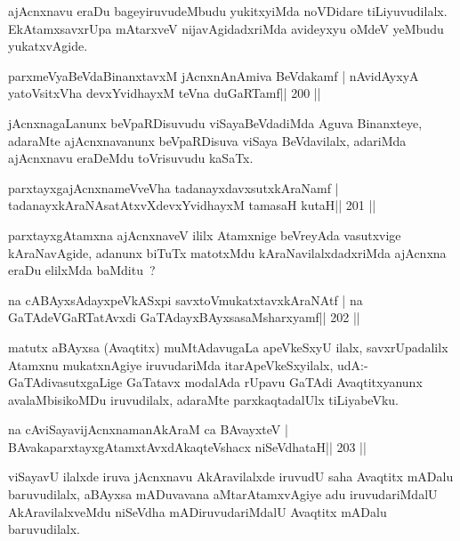 \begin{artha}
ajAcnxnavu eraDu bageyiruvudeMbudu yukitxyiMda noVDidare tiLiyuvudilalx. EkAtamxsavxrUpa mAtarxveV nijavAgidadxriMda avideyxyu oMdeV yeMbudu yukatxvAgide.
\end{artha}

\begin{shl}
parxmeVyaBeVdaBinanxtavxM jAcnxnAnAmiva BeVdakamf |
nAvidAyxyA yatoV\s sitxVha devxYvidhayxM teVna duGaRTamf\hfill || 200 ||
\end{shl}

\begin{artha}
jAcnxnagaLanunx beVpaRDisuvudu viSayaBeVdadiMda Aguva Binanxteye, adaraMte ajAcnxnavanunx beVpaRDisuva viSaya BeVdavilalx, adariMda ajAcnxnavu eraDeMdu toVrisuvudu kaSaTx.
\end{artha}


\begin{shl}
parxtayxgajAcnxnameVveVha tadanayxdavxsutxkAraNamf |
tadanayxkAraNAsatAtxvXdevxYvidhayxM tamasaH kutaH\hfill || 201 ||
\end{shl}

\begin{artha}
parxtayxgAtamxna ajAcnxnaveV ililx Atamxnige beVreyAda vasutxvige kAraNavAgide, adanunx biTuTx matotxMdu kAraNavilalxdadxriMda ajAcnxna eraDu elilxMda baMditu~?
\end{artha}

\begin{shl}
na cABAyxsAdayxpeVkASx\s pi savxtoVmukatxtavxkAraNAtf |
na GaTAdeVGaRTatAvxdi GaTAdayxBAyxsasaMsharxyamf\hfill || 202 ||
\end{shl}

\begin{artha}
matutx aBAyxsa (Avaqtitx) muMtAdavugaLa apeVkeSxyU ilalx, savxrUpadalilx Atamxnu mukatxnAgiye iruvudariMda itarApeVkeSxyilalx, udA:- GaTAdivasutxgaLige GaTatavx modalAda rUpavu GaTAdi Avaqtitxyanunx avalaMbisikoMDu iruvudilalx, adaraMte parxkaqtadalUlx tiLiyabeVku.
\end{artha}

\begin{shl}
na cAviSayavijAcnxnamanAkAraM ca BAvayxteV |
BAvakaparxtayxgAtamxtAvxdAkaqteVshacx niSeVdhataH\hfill || 203 ||
\end{shl}

\begin{artha}
viSayavU ilalxde iruva jAcnxnavu AkAravilalxde iruvudU saha Avaqtitx mADalu baruvudilalx, aBAyxsa mADuvavana aMtarAtamxvAgiye adu iruvudariMdalU AkAravilalxveMdu niSeVdha mADiruvudariMdalU Avaqtitx mADalu baruvudilalx.
\end{artha}

